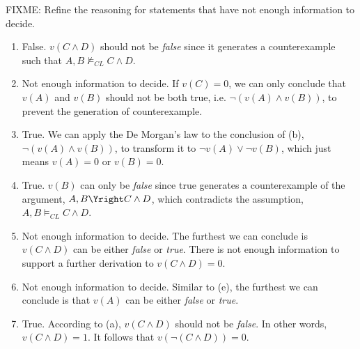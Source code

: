 FIXME: Refine the reasoning for statements that have not enough information to decide.

\begin{enumerate}
\item
False. $v(C \land D)$ should not be \textit{false} since it generates a counterexample such that $A,B \not\vDash_{CL} C \land D$.

\item
Not enough information to decide. If $v(C) = 0$, we can only conclude that $v(A)$ and $v(B)$ should not be both true, i.e. $\neg (v(A) \land v(B))$, to prevent the generation of counterexample.

\item
True. We can apply the De Morgan's law to the conclusion of (b), $\neg (v(A) \land v(B))$, to transform it to $\neg v(A) \lor \neg v(B)$, which just means $v(A) = 0$ or $v(B) = 0$.

\item
True. $v(B)$ can only be \textit{false} since true generates a counterexample of the argument, $A,B \Yright C \land D$, which contradicts the assumption, $A,B \vDash_{CL} C \land D$.

\item
Not enough information to decide. The furthest we can conclude is $v(C \land D)$ can be either \textit{false} or \textit{true}. There is not enough information to support a further derivation to $v(C \land D) = 0$.

\item
Not enough information to decide. Similar to (e), the furthest we can conclude is that $v(A)$ can be either \textit{false} or \textit{true}.

\item
True. According to (a), $v(C \land D)$ should not be \textit{false}. In other words, $v(C \land D) = 1$. It follows that $v(\neg (C \land D)) = 0$.

\end{enumerate}

